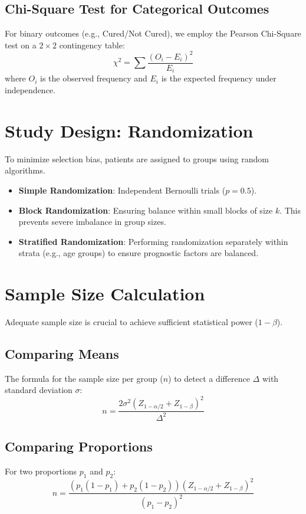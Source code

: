 \documentclass{article}
\begin{document}
\subsection{Chi-Square Test for Categorical Outcomes}
For binary outcomes (e.g., Cured/Not Cured), we employ the Pearson Chi-Square test on a $2 \times 2$ contingency table:
\begin{equation}
\chi^2 = \sum \frac{(O_i - E_i)^2}{E_i}
\end{equation}
where $O_i$ is the observed frequency and $E_i$ is the expected frequency under independence.

\section{Study Design: Randomization}
To minimize selection bias, patients are assigned to groups using random algorithms.
\begin{itemize}
    \item \textbf{Simple Randomization}: Independent Bernoulli trials ($p=0.5$).
    \item \textbf{Block Randomization}: Ensuring balance within small blocks of size $k$. This prevents severe imbalance in group sizes.
    \item \textbf{Stratified Randomization}: Performing randomization separately within strata (e.g., age groups) to ensure prognostic factors are balanced.
\end{itemize}

\section{Sample Size Calculation}
Adequate sample size is crucial to achieve sufficient statistical power ($1-\beta$).

\subsection{Comparing Means}
The formula for the sample size per group ($n$) to detect a difference $\Delta$ with standard deviation $\sigma$:
\begin{equation}
n = \frac{2\sigma^2 (Z_{1-\alpha/2} + Z_{1-\beta})^2}{\Delta^2}
\end{equation}

\subsection{Comparing Proportions}
For two proportions $p_1$ and $p_2$:
\begin{equation}
n = \frac{(p_1(1-p_1) + p_2(1-p_2)) (Z_{1-\alpha/2} + Z_{1-\beta})^2}{(p_1 - p_2)^2}
\end{equation}
\end{document}

